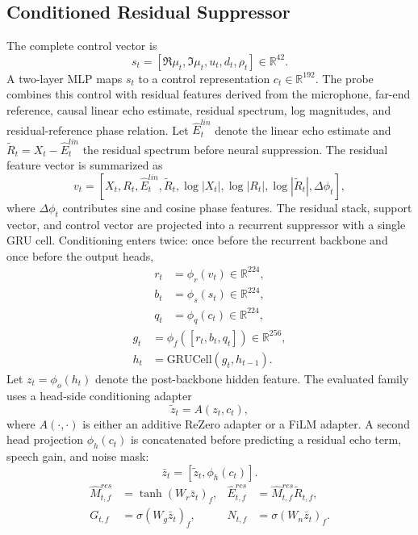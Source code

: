 \documentclass[journal]{IEEEtran}
\begin{document}
\subsection{Conditioned Residual Suppressor}
The complete control vector is
\begin{equation}
s_t = [\Re\mu_t, \Im\mu_t, u_t, d_t, \rho_t] \in \mathbb{R}^{42}.
\end{equation}
A two-layer MLP maps $s_t$ to a control representation $c_t \in \mathbb{R}^{192}$. The probe combines this control with residual features derived from the microphone, far-end reference, causal linear echo estimate, residual spectrum, log magnitudes, and residual-reference phase relation. Let $\hat{E}^{lin}_t$ denote the linear echo estimate and $\tilde{R}_t = X_t - \hat{E}^{lin}_t$ the residual spectrum before neural suppression. The residual feature vector is summarized as
\begin{equation}
v_t=[X_t,R_t,\hat{E}^{lin}_t,\tilde{R}_t,\log |X_t|,\log |R_t|,\log |\tilde{R}_t|,\Delta\phi_t],
\end{equation}
where $\Delta\phi_t$ contributes sine and cosine phase features. The residual stack, support vector, and control vector are projected into a recurrent suppressor with a single GRU cell. Conditioning enters twice: once before the recurrent backbone and once before the output heads,
\begin{align}
r_t &= \phi_r(v_t) \in \mathbb{R}^{224}, \nonumber\\
b_t &= \phi_s(s_t) \in \mathbb{R}^{224}, \nonumber\\
q_t &= \phi_q(c_t) \in \mathbb{R}^{224},
\end{align}
\begin{align}
g_t &= \phi_f([r_t, b_t, q_t]) \in \mathbb{R}^{256}, \nonumber\\
h_t &= \mathrm{GRUCell}(g_t, h_{t-1}).
\end{align}
Let $z_t = \phi_o(h_t)$ denote the post-backbone hidden feature. The evaluated family uses a head-side conditioning adapter
\begin{equation}
\tilde{z}_t = A(z_t, c_t),
\end{equation}
where $A(\cdot,\cdot)$ is either an additive ReZero adapter or a FiLM adapter. A second head projection $\phi_h(c_t)$ is concatenated before predicting a residual echo term, speech gain, and noise mask:
\begin{equation}
\bar{z}_t = [\tilde{z}_t, \phi_h(c_t)].
\end{equation}
\begin{align}
\hat{M}^{res}_{t,f} &= \tanh(W_r\bar{z}_t)_{f}, &
\hat{E}^{res}_{t,f} &= \hat{M}^{res}_{t,f}\tilde{R}_{t,f},\\
G_{t,f} &= \sigma(W_g\bar{z}_t)_f, &
N_{t,f} &= \sigma(W_n\bar{z}_t)_f.
\end{align}
\end{document}
